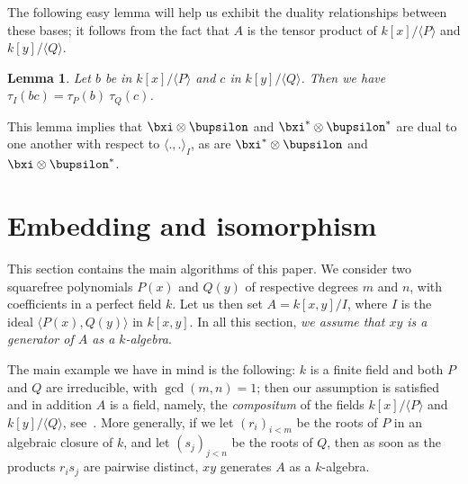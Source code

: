 \documentclass{sig-alternate}
\newcounter{algo}
\newcommand{\ang}[1]{\langle#1\rangle}
\newtheorem{Lemma}{Lemma}
\begin{document}
The following easy lemma will help us exhibit the duality
relationships between these bases; it follows from the fact that $A$
is the tensor product of $k[x]/\ang{P}$ and $k[y]/\ang{Q}$.
\begin{Lemma}
  \label{lemma:traces:PQR1}
  Let $b$ be in $k[x]/\ang{P}$ and $c$ in $k[y]/\ang{Q}$. Then we have
  $\tau_I(bc) = \tau_P(b) \ \tau_Q(c)$.
\end{Lemma}
This lemma implies that $\bxi \otimes \bupsilon$ and $\bxi^\ast
\otimes \bupsilon^\ast$ are dual to one another with respect to
$\ang{.,.}_I$, as are $\bxi^\ast \otimes \bupsilon$ and $\bxi
\otimes \bupsilon^\ast$. 


\section{Embedding and isomorphism} \label{sec:emb-iso}

This section contains the main algorithms of this paper. We consider
two squarefree polynomials $P(x)$ and $Q(y)$ of respective degrees $m$
and $n$, with coefficients in a perfect field $k$. Let us then set
$A=k[x,y]/I$, where $I$ is the ideal $\ang{P(x),Q(y)}$ in $k[x,y]$. In
all this section, {\em we assume that $xy$ is a generator of $A$ as a
  $k$-algebra}. 

The main example we have in mind is the following: $k$ is a finite
field and both $P$ and $Q$ are irreducible, with $\gcd(m,n)=1$; then
our assumption is satisfied and in addition $A$ is a field, namely,
the {\em compositum} of the fields $k[x]/\ang{P}$ and $k[y]/\ang{Q}$,
see~\cite{BrCa87}. More generally, if we let $(r_i)_{i<m}$ be the
roots of $P$ in an algebraic closure of $k$, and let $(s_j)_{j<n}$ be
the roots of $Q$, then as soon as the products $r_i s_j$ are pairwise
distinct, $xy$ generates $A$ as a $k$-algebra.
\end{document}
